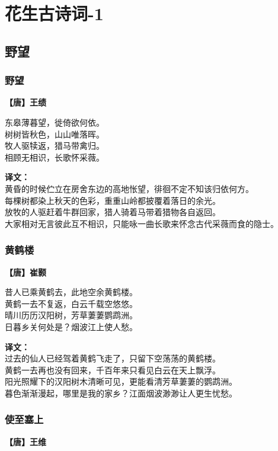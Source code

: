 \chapter{花生古诗词-1}

\section{野望}

\subsection*{野望}
\textbf{【唐】王绩}

东皋薄暮望，徙倚欲何依。\\
树树皆秋色，山山唯落晖。\\
牧人驱犊返，猎马带禽归。\\
相顾无相识，长歌怀采薇。

\bigskip
\noindent\textbf{译文：}\\
黄昏的时候伫立在房舍东边的高地怅望，徘徊不定不知该归依何方。\\
每棵树都染上秋天的色彩，重重山岭都披覆着落日的余光。\\
放牧的人驱赶着牛群回家，猎人骑着马带着猎物各自返回。\\
大家相对无言彼此互不相识，只能咏一曲长歌来怀念古代采薇而食的隐士。


\subsection*{黄鹤楼}
\textbf{【唐】崔颢}

昔人已乘黄鹤去，此地空余黄鹤楼。\\
黄鹤一去不复返，白云千载空悠悠。\\
晴川历历汉阳树，芳草萋萋鹦鹉洲。\\
日暮乡关何处是？烟波江上使人愁。

\bigskip
\noindent\textbf{译文：}\\
过去的仙人已经驾着黄鹤飞走了，只留下空荡荡的黄鹤楼。\\
黄鹤一去再也没有回来，千百年来只看见白云在天上飘浮。\\
阳光照耀下的汉阳树木清晰可见，更能看清芳草萋萋的鹦鹉洲。\\
暮色渐渐漫起，哪里是我的家乡？江面烟波渺渺让人更生忧愁。


\subsection*{使至塞上}
\textbf{【唐】王维}

